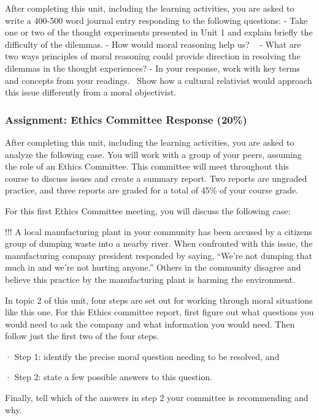 \documentclass[
]{book}
\begin{document}
After completing this unit, including the learning activities, you are asked to
write a 400-500 word journal entry responding to the following questions:
- Take one or two of the thought experiments presented in Unit 1 and explain
briefly the difficulty of the dilemmas.
- How would moral reasoning help us? ~
- What are two ways principles of moral reasoning could provide direction in
resolving the dilemmas in the thought experiences?
- In your response, work with key terms and concepts from your readings. ~Show
how a cultural relativist would approach this issue differently from a moral
objectivist.

\hypertarget{assignment-ethics-committee-response-20}{%
\subsubsection{Assignment: Ethics Committee Response (20\%)}\label{assignment-ethics-committee-response-20}}

After completing this unit, including the learning activities, you are asked to
analyze the following case. You will work with a group of your peers, assuming the role of an Ethics
Committee. This committee will meet throughout this course to
discuss issues and create a summary report. Two reports are ungraded practice, and three reports are graded for a total of 45\% of your course grade.

For this first Ethics Committee meeting, you will discuss the following case:

!!! A local manufacturing plant in your community has been accused by a citizens group of dumping waste into a nearby river. When confronted with this issue, the manufacturing company president responded by saying, ``We're not dumping that much in and we're not hurting anyone.'' Others in the community disagree and believe this practice by the manufacturing plant is harming the environment.

In topic 2 of this unit, four steps are set out for working through moral situations like this one. For this Ethics committee report, first figure out what questions you would need to ask the company and what information you would need. Then follow just the first two of the four steps.

· Step 1: identify the precise moral question needing to be resolved, and

· Step 2: state a few possible answers to this question.

Finally, tell which of the answers in step 2 your committee is recommending and why.
\end{document}

